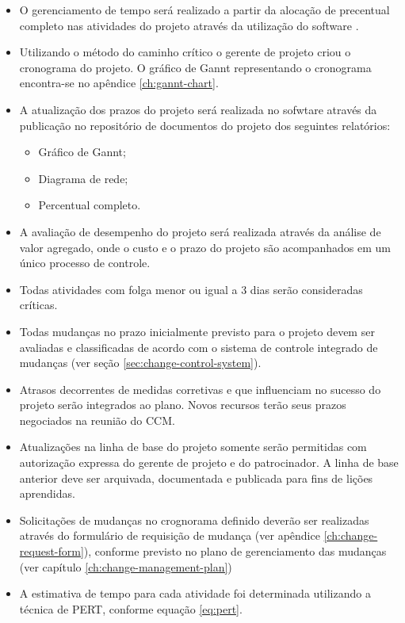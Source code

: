 \begin{itemize}
	\item O gerenciamento de tempo será realizado a partir da alocação de precentual completo nas atividades do projeto através da utilização do software \projectManagementSoftwareName.
	\item Utilizando o método do caminho crítico o gerente de projeto criou o cronograma do projeto. O gráfico de Gannt representando o cronograma encontra-se no apêndice \ref{ch:gannt-chart}.
	\item A atualização dos prazos do projeto será realizada no sofwtare \projectManagementSoftwareName através da publicação no repositório de documentos do projeto dos seguintes relatórios:
	      \begin{itemize}
		      \item Gráfico de Gannt;
		      \item Diagrama de rede;
		      \item Percentual completo.
	      \end{itemize}
	\item A avaliação de desempenho do projeto será realizada através da análise de valor agregado, onde o custo e o prazo do projeto são acompanhados em um único processo de controle.
	\item Todas atividades com folga menor ou igual a 3 dias serão consideradas críticas.
	\item Todas mudanças no prazo inicialmente previsto para o projeto devem ser avaliadas e classificadas de acordo com o sistema de controle integrado de mudanças (ver seção \ref{sec:change-control-system}).
	\item Atrasos decorrentes de medidas corretivas e que influenciam no sucesso do projeto serão integrados ao plano. Novos recursos terão seus prazos negociados na reunião do CCM.
	\item Atualizações na linha de base do projeto somente serão permitidas com autorização expressa do gerente de projeto e do patrocinador. A linha de base anterior deve ser arquivada, documentada e publicada para fins de lições aprendidas.
	\item Solicitações de mudanças no crognorama definido deverão ser realizadas através do formulário de requisição de mudança (ver apêndice \ref{ch:change-request-form}), conforme previsto no plano de gerenciamento das mudanças (ver capítulo \ref{ch:change-management-plan})
	\item A estimativa de tempo para cada atividade foi determinada utilizando a técnica de PERT, conforme equação \ref{eq:pert}.


\end{itemize}
